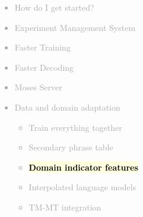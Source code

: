 \documentclass[landscape]{uedslides2C}
\newcommand{\currenttopic}[1]{\colorbox{lightyellow}{\textcolor{black}{\bf #1}}}
\begin{document}
% 
% 
% 
% 
% 
% 



\vspace{-5mm}
\textcolor{darkgrey}{
\begin{itemize} \itemsep -1mm
\item {How do I get started?}
\item {Experiment Management System}
\item {Faster Training}
\item {Faster Decoding}
\item {Moses Server}
\item {Data and domain adaptation}
  \begin{itemize} \vspace{-5mm}
  \item {Train everything together}
  \item {Secondary phrase table}
  \item \currenttopic{Domain indicator features}
\item Interpolated language models
  \item TM-MT integration
  \end{itemize}
\end{itemize}
}
\end{document}
